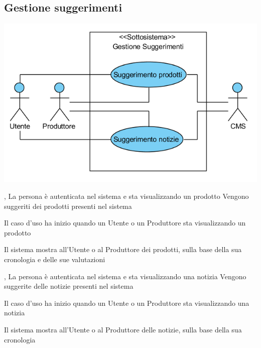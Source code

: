 \subsection{Gestione suggerimenti}
\begin{center}
   \includegraphics[width=\textwidth]{assets/visualParadigm/GestioneSuggerimenti}
\end{center}
{, }
{La persona è autenticata nel sistema e sta visualizzando un prodotto}
{Vengono suggeriti dei prodotti presenti nel sistema}
{\begin{enumCU}
	\item Il caso d'uso ha inizio quando un Utente o un Produttore sta visualizzando un prodotto
	\item Il sistema mostra all'Utente o al Produttore dei prodotti, sulla base della sua cronologia e delle sue valutazioni
\end{enumCU}}

\tabcuvspace

{, }
{La persona è autenticata nel sistema e sta visualizzando una notizia}
{Vengono suggerite delle notizie presenti nel sistema}
{\begin{enumCU}
	\item Il caso d'uso ha inizio quando un Utente o un Produttore sta visualizzando una notizia
	\item Il sistema mostra all'Utente o al Produttore delle notizie, sulla base della sua cronologia
\end{enumCU}}

